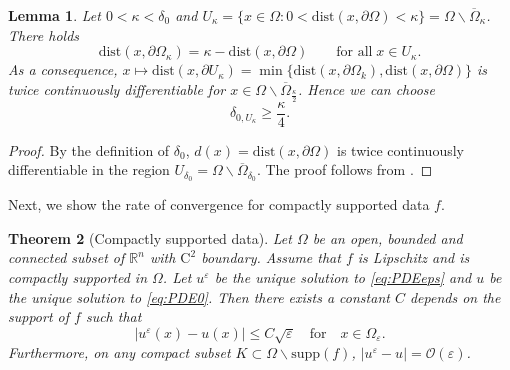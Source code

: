 \documentclass[11pt,reqno]{amsart}
\numberwithin{figure}{section}
\theoremstyle{plain}
\newtheorem{thm}{Theorem}[section]
\newtheorem{lem}[thm]{Lemma}
\theoremstyle{remark}
\numberwithin{equation}{section}
\newcommand{\R}{\mathbb{R}}
\begin{document}
\begin{lem} Let $0<\kappa < \delta_0$ and $U_\kappa = \big\{x\in \Omega: 0<\mathrm{dist}(x,\partial\Omega) < \kappa\big\} = \Omega\backslash \overline{\Omega}_\kappa$. There holds
\begin{equation*}
    \mathrm{dist}(x,\partial\Omega_\kappa) = \kappa - \mathrm{dist}(x,\partial\Omega) \qquad\text{for all}\;x\in U_\kappa.
\end{equation*}
As a consequence, $x\mapsto \mathrm{dist}(x,\partial U_\kappa) = \min\big\{\mathrm{dist}(x,\partial \Omega_k),\mathrm{dist}(x,\partial \Omega)\big\}$ is twice continuously differentiable for $x\in \Omega\backslash \overline{\Omega}_{\frac{\kappa}{2}}$. Hence we can choose 
\begin{equation}\label{e:delta_kappa}
    \delta_{0,U_\kappa} \geq \frac{\kappa}{4}.
\end{equation}
\end{lem}
\begin{proof} By the definition of $\delta_0$, $d(x) = \mathrm{dist}(x,\partial\Omega)$ is twice continuously differentiable in the region $U_{\delta_0} = \Omega\backslash \overline{\Omega}_{\delta_0}$. The proof follows from \cite[p. 355]{gilbarg_elliptic_2001}. 
\end{proof}

Next, we show the rate of convergence for compactly supported data $f$.

\begin{thm}[Compactly supported data]\label{thm:rate_doubling1} Let $\Omega$ be an open, bounded and connected subset of $\R^n$ with $\mathrm{C}^2$ boundary. Assume that $f$ is Lipschitz and is compactly supported in $\Omega$. Let $u^\varepsilon$ be the unique solution to \eqref{eq:PDEeps} and $u$ be the unique solution to \eqref{eq:PDE0}. Then there exists a constant $C$ depends on the support of $f$ such that
\begin{equation*}
|u^\varepsilon(x) - u(x)| \leq C\sqrt{\varepsilon} \quad  \text{for} \quad x\in \Omega_{\varepsilon}.
\end{equation*}
Furthermore, on any compact subset $K\subset\Omega\backslash \mathrm{supp}(f)$, $|u^\varepsilon - u| = \mathcal{O}(\varepsilon)$.
\end{thm}
\end{document}
